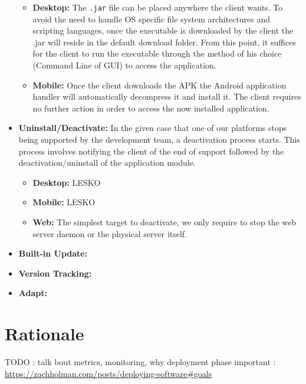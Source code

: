 \documentclass[12pt]{report}
\begin{document}
\begin{itemize}
    \begin{itemize}
        \item \textbf{Desktop:} The \texttt{.jar} file can be placed anywhere the client wants. To avoid the need to handle OS specific file system architectures and scripting languages, once the executable is downloaded by the client the .jar will reside in the default download folder. From this point, it suffices for the client to run the executable through the method of his choice (Command Line of GUI) to access the application.
        \item \textbf{Mobile:} Once the client downloads the APK the Android application handler will automatically decompress it and install it. The client requires no further action in order to access the now installed application.
    \end{itemize}
    \item \textbf{Uninstall/Deactivate:} In the given case that one of our platforms stops being supported by the development team, a deactivation process starts. This process involves notifying the client of the end of support followed by the deactivation/uninstall of the application module.
        \begin{itemize}
        \item \textbf{Desktop:} LESKO
        \item \textbf{Mobile:} LESKO
        \item \textbf{Web:} The simplest target to deactivate, we only require to stop the web server daemon or the physical server itself.
    \end{itemize}
    \item \textbf{Built-in Update:}
    \item \textbf{Version Tracking:}
    \item \textbf{Adapt:}
\end{itemize}
\section{Rationale}





TODO : talk bout metrics, monitoring, why deployment phase important :
\url{https://zachholman.com/posts/deploying-software#goals}
\end{document}
